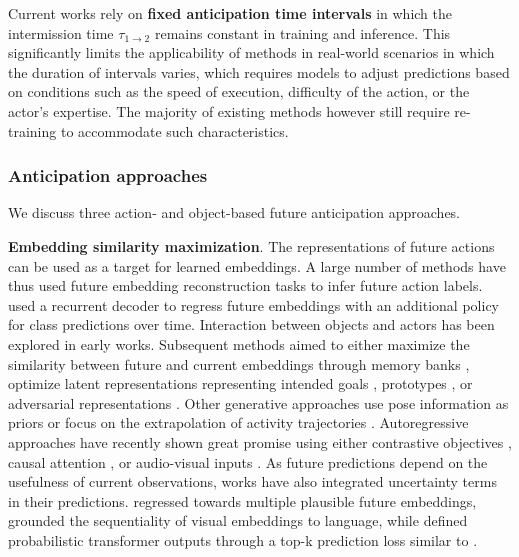 Current works rely on \textbf{fixed anticipation time intervals} in which the intermission time $\tau_{1 \rightarrow 2}$ remains constant in training and inference. This significantly limits the applicability of methods in real-world scenarios in which the duration of intervals varies, which requires models to adjust predictions based on conditions such as the speed of execution, difficulty of the action, or the actor's expertise. The majority of existing methods however still require re-training to accommodate such characteristics. 



\subsubsection{Anticipation approaches}

We discuss three action- and object-based future anticipation approaches. 


\noindent
\textbf{Embedding similarity maximization}. The representations of future actions can be used as a target for learned embeddings. A large number of methods have thus used future embedding reconstruction tasks to infer future action labels. \citet{gao2017red} used a recurrent decoder to regress future embeddings with an additional policy for class predictions over time. Interaction between objects and actors \citep{sun2019relational,luc2018predicting} has been explored in early works. Subsequent methods aimed to either maximize the similarity between future and current embeddings through memory banks \citep{liu2022hybrid}, optimize latent representations representing intended goals \citep{roy2022action}, prototypes \citep{diko2024semantically}, or adversarial representations \citep{gammulle2019predicting}. Other generative approaches use pose information as priors \citep{villegas2017learning} or focus on the extrapolation of activity trajectories \citep{chi2023adamsformer}. Autoregressive approaches have recently shown great promise using either contrastive objectives \citep{wu2020learning}, causal attention \citep{girdhar2021anticipative}, or audio-visual inputs \citep{zhong2023anticipative}. As future predictions depend on the usefulness of current observations, works have also integrated uncertainty terms in their predictions. \citet{vondrick2016anticipating} regressed towards multiple plausible future embeddings, \citet{abdelsalam2023gepsan} grounded the sequentiality of visual embeddings to language, while \citet{guo2024uncertainty} defined probabilistic transformer outputs through a top-k prediction loss similar to \citet{furnari2018leveraging}.

